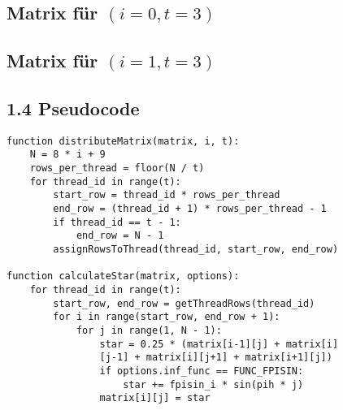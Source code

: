 \documentclass{article}
\begin{document}
\subsection*{Matrix für $(i=0, t=3)$}


\subsection*{Matrix für $(i=1, t=3)$}


\newpage
\subsection*{1.4 Pseudocode}

\begin{verbatim}
function distributeMatrix(matrix, i, t):
    N = 8 * i + 9
    rows_per_thread = floor(N / t)
    for thread_id in range(t):
        start_row = thread_id * rows_per_thread
        end_row = (thread_id + 1) * rows_per_thread - 1
        if thread_id == t - 1:
            end_row = N - 1
        assignRowsToThread(thread_id, start_row, end_row)

function calculateStar(matrix, options):
    for thread_id in range(t):
        start_row, end_row = getThreadRows(thread_id)
        for i in range(start_row, end_row + 1):
            for j in range(1, N - 1):
                star = 0.25 * (matrix[i-1][j] + matrix[i]
                [j-1] + matrix[i][j+1] + matrix[i+1][j])
                if options.inf_func == FUNC_FPISIN:
                    star += fpisin_i * sin(pih * j)
                matrix[i][j] = star
\end{verbatim}
\end{document}
